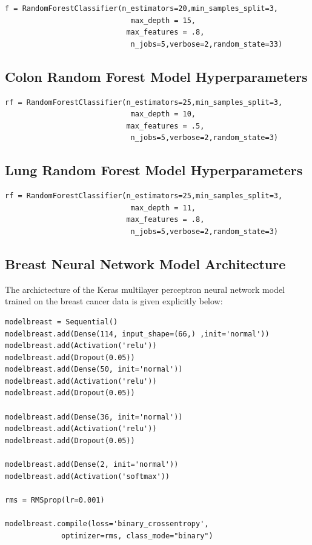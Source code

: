 \documentclass[10pt,letterpaper]{article}
\begin{document}
\begin{verbatim}
f = RandomForestClassifier(n_estimators=20,min_samples_split=3,
                             max_depth = 15,
                            max_features = .8,
                             n_jobs=5,verbose=2,random_state=33)
\end{verbatim}




\subsection*{Colon Random Forest Model Hyperparameters}
\label{subsec:colonrf}


\begin{verbatim}
rf = RandomForestClassifier(n_estimators=25,min_samples_split=3,
                             max_depth = 10,
                            max_features = .5,
                             n_jobs=5,verbose=2,random_state=3)
\end{verbatim}



\subsection*{Lung Random Forest Model Hyperparameters}
\label{subsec:lungrf}



\begin{verbatim}
rf = RandomForestClassifier(n_estimators=25,min_samples_split=3,
                             max_depth = 11,
                            max_features = .8,
                             n_jobs=5,verbose=2,random_state=3)
\end{verbatim}




\subsection*{Breast Neural Network Model Architecture}
\label{subsec:breastnn}

The archictecture of the Keras multilayer perceptron neural network model 
trained on the breast cancer data is given explicitly below:

\begin{verbatim}
modelbreast = Sequential()
modelbreast.add(Dense(114, input_shape=(66,) ,init='normal'))
modelbreast.add(Activation('relu'))
modelbreast.add(Dropout(0.05))
modelbreast.add(Dense(50, init='normal'))
modelbreast.add(Activation('relu'))
modelbreast.add(Dropout(0.05))

modelbreast.add(Dense(36, init='normal'))
modelbreast.add(Activation('relu'))
modelbreast.add(Dropout(0.05))

modelbreast.add(Dense(2, init='normal'))
modelbreast.add(Activation('softmax'))

rms = RMSprop(lr=0.001)

modelbreast.compile(loss='binary_crossentropy', 
             optimizer=rms, class_mode="binary")

\end{verbatim}
\end{document}
